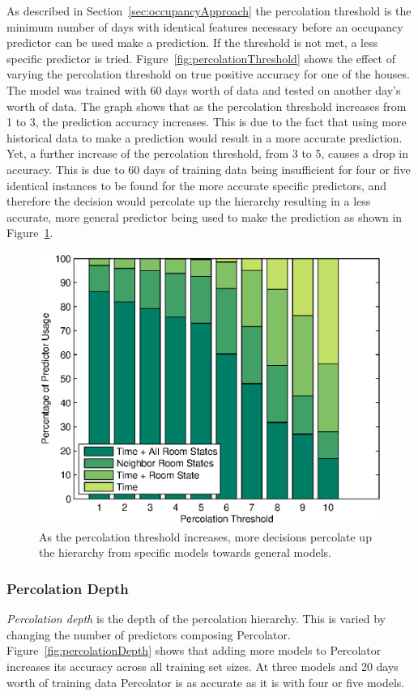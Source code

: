 As described in Section~\ref{sec:occupancyApproach} the percolation threshold is
the minimum number of days with identical features necessary before an occupancy
predictor can be used make a prediction. If the threshold is not met, a less
specific predictor is tried. Figure~\ref{fig:percolationThreshold} shows the
effect of varying the percolation threshold on true positive accuracy for one of
the houses. The model was trained with 60 days worth of data and tested on
another day's worth of data. The graph shows that as the percolation threshold
increases from 1 to 3, the prediction accuracy increases. This is due to the
fact that using more historical data to make a prediction would result in a more
accurate prediction. Yet, a further increase of the percolation threshold, from
3 to 5, causes a drop in accuracy. This is due to 60 days of training data being
insufficient for four or five identical instances to be found for the more
accurate specific predictors, and therefore the decision would percolate up the
hierarchy resulting in a less accurate, more general predictor being used to
make the prediction as shown in
Figure~\ref{fig:percolationThresholdVsModelUsage}.

\begin{figure}[!htb]
\begin{center}
\includegraphics[width=0.6\columnwidth]{fig/percolationThresholdVsModelUsage.eps}
\end{center}
\caption[Effect of percolation threshold on predictor selection]{As the
percolation threshold increases, more decisions percolate up the hierarchy from
specific models towards general models.}
\label{fig:percolationThresholdVsModelUsage}
\end{figure}

\subsubsection{Percolation Depth}
{\em Percolation depth} is the depth of the percolation hierarchy. This is
varied by changing the number of predictors composing
Percolator. Figure~\ref{fig:percolationDepth} shows that adding more models to
Percolator increases its accuracy across all training set sizes. At three models
and 20 days worth of training data Percolator is as accurate as it is with four
or five models. 

